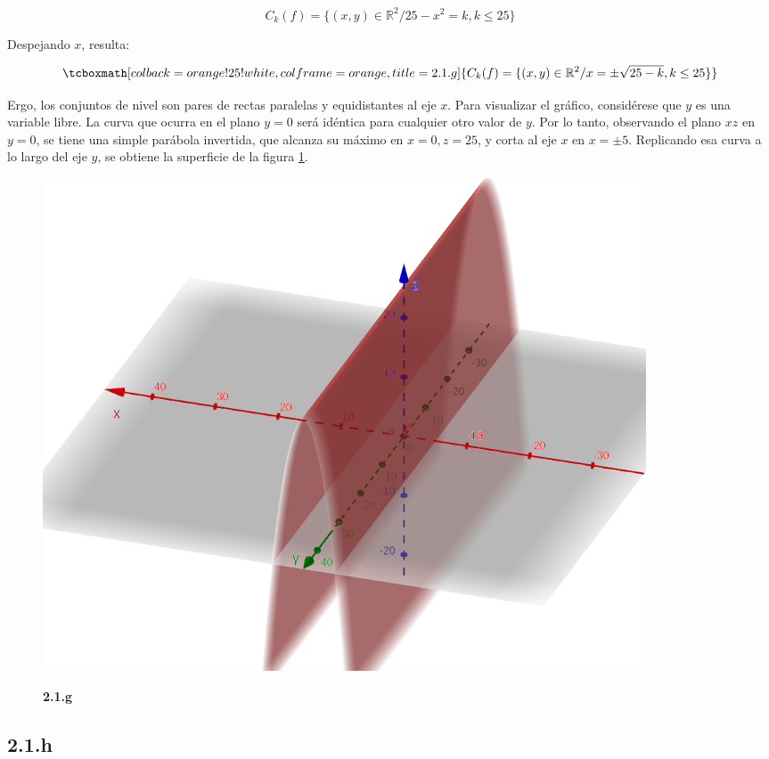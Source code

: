 \documentclass{article}
\renewcommand{\Bbb}{\mathbb}
\begin{document}
\begin{equation}
C_k(f) = \{ (x,y) \in \Bbb R^2 / 25-x^2 = k, k \leq 25 \}
\end{equation}

Despejando $x$, resulta: 

\begin{equation}
\tcboxmath[colback=orange!25!white,colframe=orange,title=2.1.g]
{ C_k(f) = \{ (x,y) \in \Bbb R^2 / x = \pm \sqrt{25-k}, k \leq 25 \} }
\end{equation}

Ergo, los conjuntos de nivel son pares de rectas paralelas y equidistantes al eje $x$. Para visualizar el gráfico, considérese que $y$ es una variable libre. La curva que ocurra en el plano $y = 0$ será idéntica para cualquier otro valor de $y$. Por lo tanto, observando el plano $xz$ en $y=0$, se tiene una simple parábola invertida, que alcanza su máximo en $x=0, z=25$, y corta al eje $x$ en $x=\pm5$. Replicando esa curva a lo largo del eje $y$, se obtiene la superficie de la figura \ref{fig:2-1-g}.

\begin{figure}[ht]
\caption{\textbf{2.1.g}}
\includegraphics[scale=0.4]{img/ejercicios/2/1-g.png} 
\centering
\label{fig:2-1-g}
\end{figure}

\subsection*{2.1.h}
\label{subsec:2.1.h}
\end{document}
